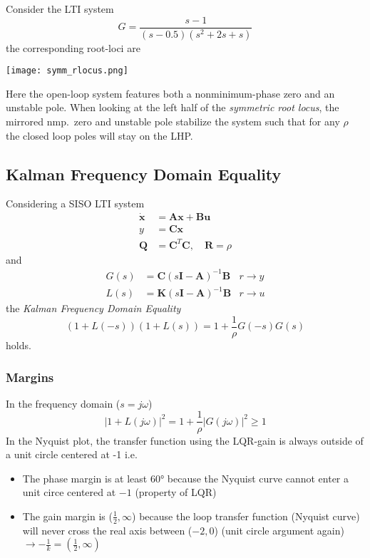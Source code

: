 \begin{examplesection}
    Consider the LTI system
    \noindent\begin{equation*}
        G = \frac{s-1}{(s-0.5)(s^2+2s+s)}
    \end{equation*}
    the corresponding root-loci are
    \begin{center}
        \texttt{[image: symm\_rlocus.png]}
    \end{center}
    Here the open-loop system features both a nonminimum-phase zero and an unstable pole.
    When looking at the left half of the \textit{symmetric root locus}, the mirrored nmp.\ zero and unstable pole stabilize the system such that
    for any $\rho$ the closed loop poles will stay on the LHP.
\end{examplesection}

\subsection{Kalman Frequency Domain Equality}
Considering a SISO LTI system
\noindent\begin{align*}
    \dot{\mathbf{x}} & = \mathbf{Ax} + \mathbf{Bu}                      \\
    y                & = \mathbf{Cx}                                    \\
    \mathbf{Q}       & = \mathbf{C}^T \mathbf{C}, \quad \mathbf{R}=\rho
\end{align*}
and
\noindent\begin{align*}
    G(s) & = \mathbf{C}{(s \mathbf{I}-\mathbf{A})}^{-1}\mathbf{B} & r\to y \\
    L(s) & = \mathbf{K}{(s \mathbf{I}-\mathbf{A})}^{-1}\mathbf{B} & r\to u
\end{align*}
the \textit{Kalman Frequency Domain Equality}
\noindent\begin{equation*}
    (1+L(-s))(1+L(s)) = 1+\frac{1}{\rho}G(-s)G(s)
\end{equation*}
holds.

\subsubsection{Margins}
In the frequency domain ($s=j\omega$)
\noindent\begin{equation*}
    \left|1+L(j\omega)\right|^2=1+\frac1\rho\left|G(j\omega)\right|^2\geq1
\end{equation*}
In the Nyquist plot, the transfer function using the LQR-gain is always outside of a unit circle centered at -1 i.e.
\begin{itemize}
    \item The phase margin is at least 60° because the Nyquist curve cannot enter a unit circe centered at $-1$ (property of LQR)
    \item The gain margin is ($\frac{1}{2},\infty$) because the loop transfer function (Nyquist curve) will never cross the real axis between ($-2, 0$) (unit circle argument again)\newline $\to -\frac{1}{k} = (\frac{1}{2}, \infty)$
\end{itemize}